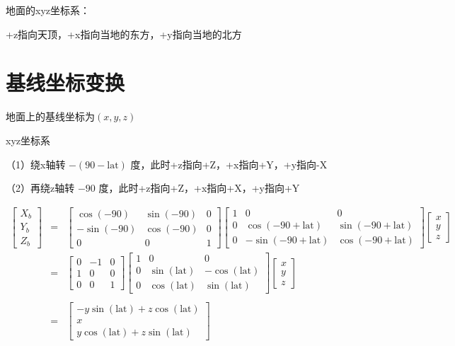 \documentclass[11pt, a4paper]{article}  %
\begin{document}
\begin{CJK}{UTF8}{gbsn}
地面的xyz坐标系：

\indent\indent +z指向天顶，+x指向当地的东方，+y指向当地的北方





\section{基线坐标变换}

地面上的基线坐标为$(x,y,z)$

xyz坐标系

（1）绕x轴转 $-(90-\text{lat})$ 度，此时+z指向+Z，+x指向+Y，+y指向-X

（2）再绕z轴转 $-90$ 度，此时+z指向+Z，+x指向+X，+y指向+Y

\begin{eqnarray}
	\begin{bmatrix} X_b \\ Y_b \\ Z_b \end{bmatrix}
		&=& \begin{bmatrix} \cos(-90) & \sin(-90) & 0 \\ -\sin(-90) & \cos(-90) & 0 \\ 0 & 0 & 1 \end{bmatrix} 
		    \begin{bmatrix} 1 & 0 & 0 \\ 0 & \cos(-90+\text{lat}) & \sin(-90+\text{lat}) \\ 0 & -\sin(-90+\text{lat}) & \cos(-90+\text{lat}) \end{bmatrix}
		    \begin{bmatrix} x \\ y \\ z \end{bmatrix} \nonumber \\
		&=& \begin{bmatrix} 0 & -1 & 0 \\ 1 & 0 & 0 \\ 0 & 0 & 1 \end{bmatrix} 
		    \begin{bmatrix} 1 & 0 & 0 \\ 0 & \sin(\text{lat}) & -\cos(\text{lat}) \\ 0 & \cos(\text{lat}) & \sin(\text{lat}) \end{bmatrix}
		    \begin{bmatrix} x \\ y \\ z \end{bmatrix} \nonumber \\ \nonumber \\
		&=& \begin{bmatrix} -y\sin(\text{lat})+z\cos(\text{lat}) \\ x \\ y\cos(\text{lat})+z\sin(\text{lat}) \end{bmatrix} 
\end{eqnarray}






\end{CJK}
\end{document}
